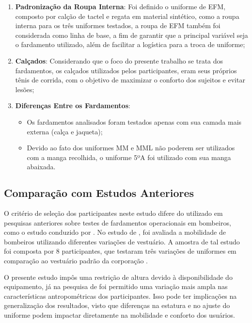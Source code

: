 \begin{enumerate}[label=\Roman*]
    \item \textbf{Padronização da Roupa Interna}: Foi definido o uniforme de \acrfull{EFM}, composto por calção de tactel e regata em material sintético, como a roupa interna para os três uniformes testados, a roupa de \acrshort{EFM} também foi considerada como linha de base, a fim de garantir que a principal variável seja o fardamento utilizado, além de facilitar a logística para a troca de uniforme;
    \item \textbf{Calçados}: Considerando que o foco do presente trabalho se trata dos fardamentos, os calçados utilizados pelos participantes, eram seus próprios tênis de corrida, com o objetivo de maximizar o conforto dos sujeitos e evitar lesões;
    \item \textbf{Diferenças Entre os Fardamentos}: 
    \begin{itemize}
        \item Os fardamentos analisados foram testados apenas com sua camada mais externa (calça e jaqueta);
        \item Devido ao fato dos uniformes \acrshort{MM} e \acrshort{MML} não poderem ser utilizados com a manga recolhida, o uniforme 5ºA foi utilizado com sua manga abaixada.
    \end{itemize}
     
\end{enumerate}

\subsection{Comparação com Estudos Anteriores}

O critério de seleção dos participantes neste estudo difere do utilizado em pesquisas anteriores 
sobre testes de fardamentos operacionais em bombeiros, como o estudo conduzido por 
\textcite{orr2019impact}. No estudo de \textcite{orr2019impact}, foi avaliada a mobilidade de 
bombeiros utilizando diferentes variações de vestuário. A amostra de tal estudo foi composta por 
8 participantes, que testaram três variações de uniformes em comparação ao vestuário padrão da 
corporação \cite{orr2019impact}.

O presente estudo impôs uma restrição de altura devido à disponibilidade do equipamento, 
já na pesquisa de \textcite{orr2019impact} foi permitido uma variação mais ampla nas características 
antropométricas dos participantes. Isso pode ter implicações na generalização dos resultados, visto 
que diferenças na estatura e no ajuste do uniforme podem impactar diretamente na mobilidade e 
conforto dos usuários.


